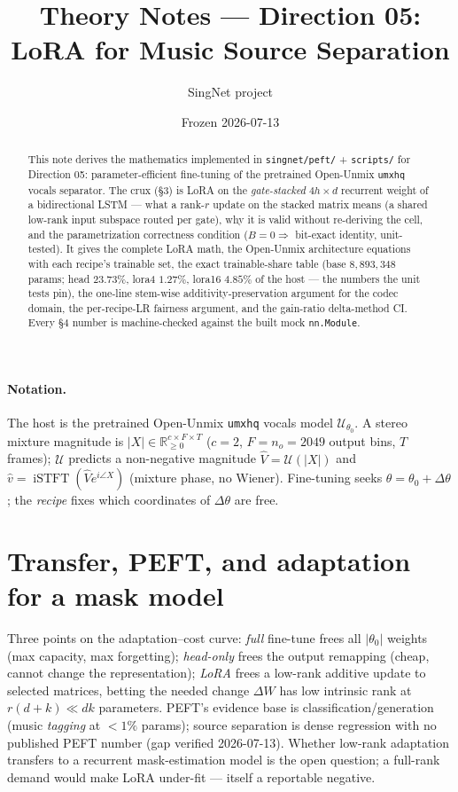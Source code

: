 \documentclass[11pt]{article}
\title{Theory Notes --- Direction 05:\\ LoRA for Music Source Separation}
\author{SingNet project}
\date{Frozen 2026-07-13}
\newcommand{\code}[1]{\texttt{#1}}
\newcommand{\iSTFT}{\operatorname{iSTFT}}
\begin{document}
\maketitle

\begin{abstract}
This note derives the mathematics implemented in \code{singnet/peft/} +
\code{scripts/} for Direction 05: parameter-efficient fine-tuning of the pretrained
Open-Unmix \code{umxhq} vocals separator. The crux (\S3) is LoRA on the
\emph{gate-stacked} $4h\times d$ recurrent weight of a bidirectional LSTM --- what a
rank-$r$ update on the stacked matrix means (a shared low-rank input subspace routed
per gate), why it is valid without re-deriving the cell, and the parametrization
correctness condition ($B=0\Rightarrow$ bit-exact identity, unit-tested). It gives the
complete LoRA math, the Open-Unmix architecture equations with each recipe's trainable
set, the exact trainable-share table (base $8{,}893{,}348$ params; head $23.73\%$,
lora4 $1.27\%$, lora16 $4.85\%$ of the host --- the numbers the unit tests pin), the
one-line stem-wise additivity-preservation argument for the codec domain, the
per-recipe-LR fairness argument, and the gain-ratio delta-method CI. Every \S4 number is
machine-checked against the built mock \code{nn.Module}.
\end{abstract}

\paragraph{Notation.} The host is the pretrained Open-Unmix \code{umxhq} vocals model
$\mathcal U_{\theta_0}$. A stereo mixture magnitude is $|X|\in\mathbb
R_{\ge0}^{c\times F\times T}$ ($c=2$, $F=n_o=2049$ output bins, $T$ frames); $\mathcal U$
predicts a non-negative magnitude $\widehat V=\mathcal U(|X|)$ and $\hat
v=\iSTFT(\widehat V e^{i\angle X})$ (mixture phase, no Wiener). Fine-tuning seeks
$\theta=\theta_0+\Delta\theta$; the \emph{recipe} fixes which coordinates of
$\Delta\theta$ are free.

\section{Transfer, PEFT, and adaptation for a mask model}
Three points on the adaptation--cost curve: \emph{full} fine-tune frees all $|\theta_0|$
weights (max capacity, max forgetting); \emph{head-only} frees the output remapping
(cheap, cannot change the representation); \emph{LoRA} frees a low-rank additive update to
selected matrices, betting the needed change $\Delta W$ has low intrinsic rank at
$r(d+k)\ll dk$ parameters. PEFT's evidence base is classification/generation (music
\emph{tagging} at ${<}1\%$ params); source separation is dense regression with no
published PEFT number (gap verified 2026-07-13). Whether low-rank adaptation transfers to a
recurrent mask-estimation model is the open question; a full-rank demand would make LoRA
under-fit --- itself a reportable negative.
\end{document}
